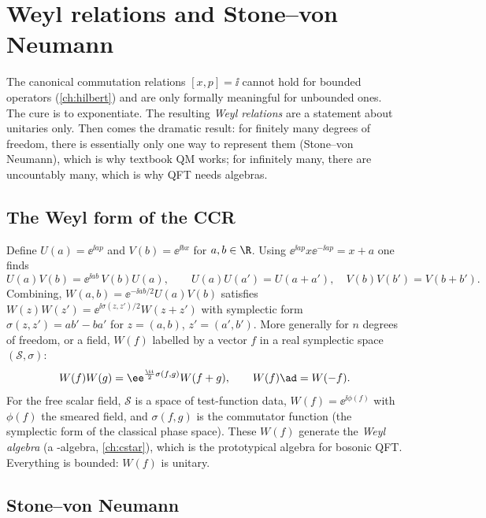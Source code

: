 \chapter{Weyl relations and Stone--von Neumann}\label{ch:weyl}
\skippable

\begin{physmotiv}
The canonical commutation relations $[x,p]=\ii$ cannot hold for bounded operators (\cref{ch:hilbert}) and are only formally meaningful for unbounded ones. The cure is to exponentiate. The resulting \emph{Weyl relations} are a statement about unitaries only. Then comes the dramatic result: for finitely many degrees of freedom, there is essentially only one way to represent them (Stone--von Neumann), which is why textbook QM works; for infinitely many, there are uncountably many, which is why QFT needs algebras.
\end{physmotiv}

\section{The Weyl form of the CCR}

Define $U(a)=\ee^{\ii ap}$ and $V(b)=\ee^{\ii bx}$ for $a,b\in\R$. Using $\ee^{\ii ap}x\ee^{-\ii ap}=x+a$ one finds
\begin{equation}
U(a)V(b)=\ee^{\ii ab}\,V(b)U(a),\qquad U(a)U(a')=U(a+a'),\quad V(b)V(b')=V(b+b').\label{eq:weyl}
\end{equation}
Combining, $W(a,b)=\ee^{-\ii ab/2}U(a)V(b)$ satisfies $W(z)W(z')=\ee^{\ii\sigma(z,z')/2}W(z+z')$ with symplectic form $\sigma(z,z')=ab'-ba'$ for $z=(a,b)$, $z'=(a',b')$. More generally for $n$ degrees of freedom, or a field, $W(f)$ labelled by a vector $f$ in a real symplectic space $(\mathcal S,\sigma)$:
\begin{equation}
W(f)W(g)=\ee^{\frac\ii2\sigma(f,g)}W(f+g),\qquad W(f)\ad=W(-f).
\end{equation}
For the free scalar field, $\mathcal S$ is a space of test-function data, $W(f)=\ee^{\ii\phi(f)}$ with $\phi(f)$ the smeared field, and $\sigma(f,g)$ is the commutator function (the symplectic form of the classical phase space). These $W(f)$ generate the \emph{Weyl algebra} (a \cstar-algebra, \cref{ch:cstar}), which is the prototypical algebra for bosonic QFT. Everything is bounded: $W(f)$ is unitary.

\section{Stone--von Neumann}

